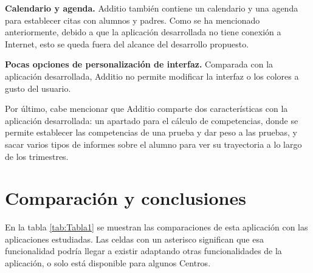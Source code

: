 \textbf {Calendario y agenda.} Additio también contiene un calendario y una agenda para establecer citas con alumnos y padres. Como se ha mencionado anteriormente, debido a que la aplicación desarrollada no tiene conexión a Internet, esto se queda fuera del alcance del desarrollo propuesto.

\textbf {Pocas opciones de personalización de interfaz.} Comparada con la aplicación desarrollada, Additio no permite modificar la interfaz o los colores a gusto del usuario.

Por último, cabe mencionar que Additio comparte dos características con la aplicación desarrollada: un apartado para el cálculo de competencias, donde se permite establecer las competencias de una prueba y dar peso a las pruebas, y sacar varios tipos de informes sobre el alumno para ver su trayectoria a lo largo de los trimestres.


\section{Comparación y conclusiones}

En la tabla \ref{tab:Tabla1} se muestran las comparaciones de esta aplicación con las aplicaciones estudiadas. Las celdas con un asterisco significan que esa funcionalidad podría llegar a existir adaptando otras funcionalidades de la aplicación, o solo está disponible para algunos Centros.


